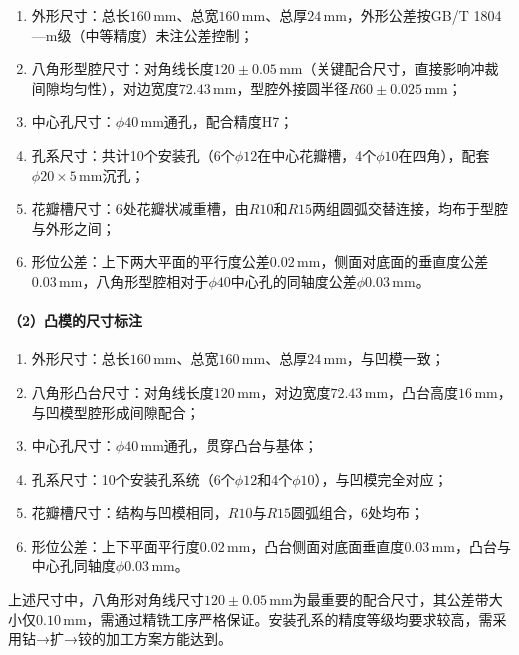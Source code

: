 \documentclass{xautCADreport}
\begin{document}
\begin{enumerate}
  \item 外形尺寸：总长$160\,\mathrm{mm}$、总宽$160\,\mathrm{mm}$、总厚$24\,\mathrm{mm}$，外形公差按GB/T 1804—m级（中等精度）未注公差控制；
  \item 八角形型腔尺寸：对角线长度$120\pm0.05\,\mathrm{mm}$（关键配合尺寸，直接影响冲裁间隙均匀性），对边宽度$72.43\,\mathrm{mm}$，型腔外接圆半径$R60\pm0.025\,\mathrm{mm}$；
  \item 中心孔尺寸：$\phi40\,\mathrm{mm}$通孔，配合精度H7；
  \item 孔系尺寸：共计10个安装孔（6个$\phi12$在中心花瓣槽，4个$\phi10$在四角），配套$\phi20\times5\,\mathrm{mm}$沉孔；
  \item 花瓣槽尺寸：6处花瓣状减重槽，由$R10$和$R15$两组圆弧交替连接，均布于型腔与外形之间；
  \item 形位公差：上下两大平面的平行度公差$0.02\,\mathrm{mm}$，侧面对底面的垂直度公差$0.03\,\mathrm{mm}$，八角形型腔相对于$\phi40$中心孔的同轴度公差$\phi0.03\,\mathrm{mm}$。
\end{enumerate}

\paragraph{（2）凸模的尺寸标注}

\begin{enumerate}
  \item 外形尺寸：总长$160\,\mathrm{mm}$、总宽$160\,\mathrm{mm}$、总厚$24\,\mathrm{mm}$，与凹模一致；
  \item 八角形凸台尺寸：对角线长度$120\,\mathrm{mm}$，对边宽度$72.43\,\mathrm{mm}$，凸台高度$16\,\mathrm{mm}$，与凹模型腔形成间隙配合；
  \item 中心孔尺寸：$\phi40\,\mathrm{mm}$通孔，贯穿凸台与基体；
  \item 孔系尺寸：10个安装孔系统（6个$\phi12$和4个$\phi10$），与凹模完全对应；
  \item 花瓣槽尺寸：结构与凹模相同，$R10$与$R15$圆弧组合，6处均布；
  \item 形位公差：上下平面平行度$0.02\,\mathrm{mm}$，凸台侧面对底面垂直度$0.03\,\mathrm{mm}$，凸台与中心孔同轴度$\phi0.03\,\mathrm{mm}$。
\end{enumerate}

上述尺寸中，八角形对角线尺寸$120\pm0.05\,\mathrm{mm}$为最重要的配合尺寸，其公差带大小仅$0.10\,\mathrm{mm}$，需通过精铣工序严格保证。安装孔系的精度等级均要求较高，需采用钻→扩→铰的加工方案方能达到。
\end{document}
